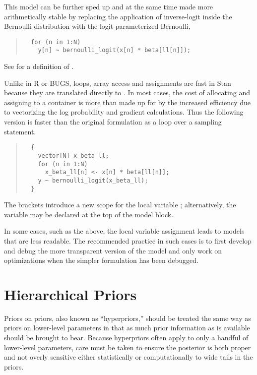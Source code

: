 This model can be further sped up and at the same time made more
arithmetically stable by replacing the application of inverse-logit
inside the Bernoulli distribution with the logit-parameterized
Bernoulli,
%
\begin{quote}
\begin{Verbatim}
  for (n in 1:N)
    y[n] ~ bernoulli_logit(x[n] * beta[ll[n]]);    
\end{Verbatim}
\end{quote}
%
See  for a definition of
.

Unlike in R or BUGS, loops, array access and assignments are fast in
Stan because they are translated directly to \Cpp.  In most cases, the
cost of allocating and assigning to a container is more than made up
for by the increased efficiency due to vectorizing the log probability
and gradient calculations.  Thus the following version is faster than
the original formulation as a loop over a sampling statement.
%
\begin{quote}
\begin{Verbatim}
  {
    vector[N] x_beta_ll;
    for (n in 1:N)
      x_beta_ll[n] <- x[n] * beta[ll[n]];
    y ~ bernoulli_logit(x_beta_ll);
  }
\end{Verbatim}
\end{quote}
%
The brackets introduce a new scope for the local variable
; alternatively, the variable may be declared at the
top of the model block.  

In some cases, such as the above, the local variable assignment leads
to models that are less readable.  The recommended practice in such
cases is to first develop and debug the more transparent version of
the model and only work on optimizations when the simpler formulation
has been debugged.


\section{Hierarchical Priors}\label{hierarchical-priors.section}

Priors on priors, also known as ``hyperpriors,'' should be treated the
same way as priors on lower-level parameters in that as much prior
information as is available should be brought to bear.  Because
hyperpriors often apply to only a handful of lower-level parameters,
care must be taken to ensure the posterior is both proper and not
overly sensitive either statistically or computationally to wide tails
in the priors.

